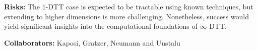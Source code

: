 \documentclass[a4paper,11pt]{article}
\renewcommand{\paragraph}[1]{\textbf{#1.}}
\begin{document}
\textbf{Risks:} The 1-DTT case is expected to be tractable using known
techniques, but extending to higher dimensions is more
challenging. Nonetheless, success would yield significant insights
into the computational foundations of $\infty$-DTT.

\textbf{Collaborators:} Kaposi, Gratzer, Neumann and Uustalu




  



  

\end{document}
